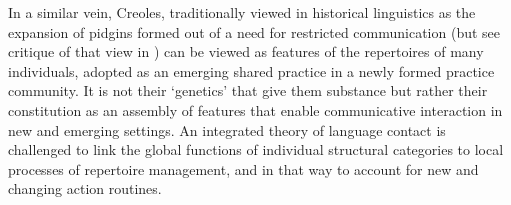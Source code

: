 \documentclass[output=paper]{langscibook}
\begin{document}
In a similar vein, Creoles, traditionally viewed in historical linguistics as the expansion of pidgins formed out of a need for restricted communication (but see critique of that view in \citealt{mufwene_creoles_2021}) can be viewed as features of the repertoires of many individuals, adopted as an emerging shared practice in a newly formed practice community. It is not their ‘genetics’ that give them substance but rather their constitution as an assembly of features that enable communicative interaction in new and emerging settings. An integrated theory of language contact is challenged to link the global functions of individual structural categories to local processes of repertoire management, and in that way to account for new and changing action routines.

\printbibliography[heading=subbibliography, notkeyword=this]
\end{document}
